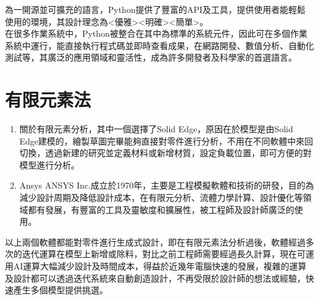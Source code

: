 為一開源並可擴充的語言，Python提供了豐富的API及工具，提供使用者能輕鬆使用的環境，其設計理念為<優雅><明確><簡單>。\\

在很多作業系統中，Python被整合在其中為標準的系統元件，因此可在多個作業系統中運行，能直接執行程式碼並即時查看成果，在網路開發、數值分析、自動化測試等，其廣泛的應用領域和靈活性，成為許多開發者及科學家的首選語言。\\

\section{有限元素法}
\begin{enumerate}
\item 關於有限元素分析，其中一個選擇了Solid Edge，原因在於模型是由Solid Edge建模的，繪製草圖完畢能夠直接對零件進行分析，不用在不同軟體中來回切換，透過新建的研究並定義材料或新增材質，設定負載位置，即可方便的對模型進行分析。\\

\item Ansys
ANSYS Inc.成立於1970年，主要是工程模擬軟體和技術的研發，目的為減少設計周期及降低設計成本，在有限元分析、流體力學計算、設計優化等領域都有發展，有豐富的工具及靈敏度和擴展性，被工程師及設計師廣泛的使用。\\
\end{enumerate}

以上兩個軟體都能對零件進行生成式設計，即在有限元素法分析過後，軟體經過多次的迭代運算在模型上新增或除料，對比之前工程師需要經過長久計算，現在可運用AI運算大幅減少設計及時間成本，得益於近幾年電腦快速的發展，複雜的運算及設計都可以透過迭代系統來自動創造設計，不再受限於設計師的想法或經驗，快速產生多個模型提供挑選。
\newpage
